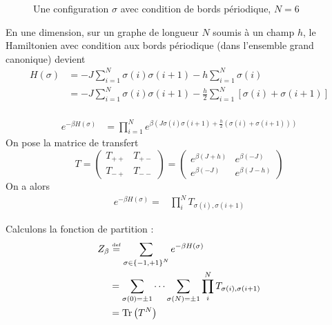 \documentclass[french]{beamer}
\newcommand\eqdef{\overset{\mbox{\tiny def}}{=}}
\DeclareMathOperator{\Tr}{Tr}
\begin{document}
\begin{frame}
\begin{figure}
	\centering
	\caption{Une configuration $\sigma$ avec condition de bords périodique, $N = 6$}
\end{figure}
En une dimension, sur un graphe de longueur $N$ soumis à un champ $h$, le Hamiltonien avec condition aux bords  périodique (dans l'ensemble grand canonique) devient
\begin{align*}
H(\sigma) &= -J \sum_{i = 1}^{N} \sigma(i) \sigma(i + 1) -h \sum_{i = 1}^{N} \sigma(i) \\
& = -J \sum_{i = 1}^{N} \sigma(i) \sigma(i + 1) -\frac{h}{2} \sum_{i = 1}^{N} \left[\sigma(i) + \sigma(i+1)\right]\\
\end{align*}
\end{frame}

\begin{frame}
\begin{align*}
e^{-\beta H(\sigma)} &= \prod_{i = 1}^{N} e^{\beta \left(J\sigma(i)\sigma(i+1) +\frac{h}{2}\left(\sigma(i) + \sigma(i+1)\right)\right) }
\end{align*}
On pose la matrice de transfert
\[T =
\begin{pmatrix}
T_{++} & T_{+-} \\
T_{-+}  &  T_{--}
\end{pmatrix}
=
\begin{pmatrix}
e^{\beta(J + h)}  &   e^{\beta(- J)} \\
e^{\beta(-J)} & e^{\beta(J - h)}
\end{pmatrix}
\]
On a alors
\begin{align*}
e^{-\beta H(\sigma)} =& \prod_{i}^{N} T_{\sigma(i), \sigma(i+1)}
\end{align*}
\end{frame}

\begin{frame}
Calculons la fonction de partition :
\begin{align*}
Z_\beta &\eqdef \sum_{\sigma \in \left\{-1, +1\right\}^N} e^{-\beta H(\sigma)} \\
&=\sum_{\sigma(0) = \pm 1} \dots \sum_{\sigma(N) = \pm 1} \prod_{i}^{N} T_{\sigma(i), \sigma(i+1)} \\
&= \Tr\left(T^N\right)
\end{align*}
\end{frame}
\end{document}
